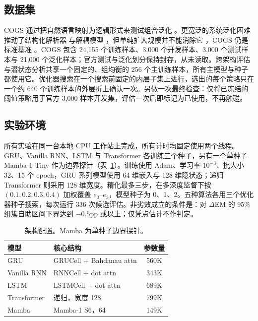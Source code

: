 \documentclass[12pt,a4paper]{article}
\begin{document}
\subsection{数据集}
COGS 通过把自然语言映射为逻辑形式来测试组合泛化 \citep{kim2020cogs}。更宽泛的系统泛化困难 \citep{keysers2020measuring,furrer2020compositional} 推动了结构化解析器 \citep{herzig2021span,shaw2021compositional} 与解耦模型 \citep{zheng2022disentangled}，但单纯扩大规模并不能消除它 \citep{qiu2022evaluating,li2023slog}，COGS 仍是标准基准 \citep{weissenhorn2022compositional}。COGS 包含 24,155 个训练样本、3,000 个开发样本、3,000 个测试样本与 21,000 个泛化样本；官方测试与泛化划分保持封存，从未读取。跨架构评估与潜状态分析共享一个固定的、组均衡的 256 个主训练样本，所有主模型与种子都使用它。优化器搜索在一个搜索前固定的内层子集上进行，选出的每个策略只在一个约 640 个训练样本的外层折上确认一次。另做一次最终检查：仅将已冻结的阈值策略用于官方 3,000 样本开发集，评估一次后即标记为已使用，不再触碰。

\subsection{实验环境}
所有实验在同一台本地 CPU 工作站上完成，所有计时均固定使用两个线程。GRU、Vanilla RNN、LSTM 与 Transformer 各训练三个种子，另有一个单种子 Mamba-1-Tiny 作为边界探针（表~\ref{tab:models}）。训练使用 Adam、学习率 $10^{-3}$、批大小 32、15 个 epoch，GRU 系列模型使用 64 维嵌入与 128 维隐状态；递归 Transformer 则采用 128 维宽度。精化最多三步，在多深度监督下按 $(0.1,0.2,0.3,0.4)$ 加权覆盖 $e_0$--$e_3$，模型种子为 0、1、2。五种算法各用三个优化器种子搜索，每次运行 336 次候选评估。非劣效成立的条件是：对 $\Delta$EM 的 95\% 组簇自助区间下界达到 $-0.5$pp 或以上；仅凭点估计不作判定。

\begin{table}[H]
\centering
\small
\begin{tabular}{llc}
\toprule
模型 & 核心结构 & 参数量 \\
\midrule
GRU & GRUCell + Bahdanau attn & 560K \\
Vanilla RNN & RNNCell + dot attn & 343K \\
LSTM & LSTMCell + dot attn & 689K \\
Transformer & 递归，宽度 128 & 799K \\
Mamba & Mamba-1 S6，64 & 149K \\
\bottomrule
\end{tabular}
\caption{架构配置。Mamba 为单种子边界探针。}
\label{tab:models}
\end{table}
\end{document}
